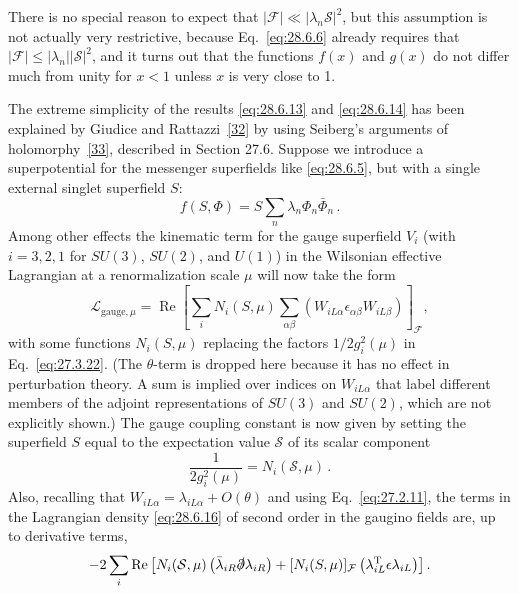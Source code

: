 There is no special reason to expect that
\(\lvert\mathcal{F}\rvert\ll
\lvert\lambda_n\mathcal{S}\rvert^2\), but this assumption is not actually
very restrictive, because Eq.~\eqref{eq:28.6.6} already requires that
\(\lvert\mathcal{F}\rvert\leq
\lvert\lambda_n\rvert\lvert\mathcal{S}\rvert^2\), and it turns out that
the functions \(f(x)\) and \(g(x)\) do not differ much from unity for
\(x<1\) unless \(x\) is very close to 1.

The extreme simplicity of the results \eqref{eq:28.6.13} and
\eqref{eq:28.6.14} has been explained by Giudice and
Rattazzi~\hyperref[ch28-ref-32]{[32]} by using Seiberg's arguments of
holomorphy~\hyperref[ch28-ref-33]{[33]}, described in Section 27.6.
Suppose we introduce a superpotential for the messenger superfields like
\eqref{eq:28.6.5}, but with a single external singlet superfield \(S\):
\begin{equation}
  f(S,\Phi)=S\sum_n\lambda_n\Phi_n\bar\Phi_n\,.
  \tag{28.6.15}\label{eq:28.6.15}
\end{equation}
Among other effects the kinematic term for the gauge superfield \(V_i\)
(with \(i=3,2,1\) for \(SU(3)\), \(SU(2)\), and \(U(1)\)) in the
Wilsonian effective Lagrangian at a renormalization scale \(\mu\) will now
take the form
\begin{equation}
  \mathcal{L}_{\mathrm{gauge},\mu}
  =\operatorname{Re}
  \left[
    \sum_iN_i(S,\mu)
    \sum_{\alpha\beta}
      \left(W_{iL\alpha}\epsilon_{\alpha\beta}W_{iL\beta}\right)
  \right]_{\mathcal{F}},
  \tag{28.6.16}\label{eq:28.6.16}
\end{equation}
with some functions \(N_i(S,\mu)\) replacing the factors
\(1/2g_i^2(\mu)\) in Eq.~\eqref{eq:27.3.22}. (The \(\theta\)-term is
dropped here because it has no effect in perturbation theory. A sum is
implied over indices on \(W_{iL\alpha}\) that label different members of
the adjoint representations of \(SU(3)\) and \(SU(2)\), which are not
explicitly shown.) The gauge coupling constant is now given by setting the
superfield \(S\) equal to the expectation value \(\mathcal{S}\) of its
scalar component
\begin{equation}
  \frac{1}{2g_i^2(\mu)}=N_i(\mathcal{S},\mu)\,.
  \tag{28.6.17}\label{eq:28.6.17}
\end{equation}
Also, recalling that \(W_{iL\alpha}=\lambda_{iL\alpha}+O(\theta)\) and
using Eq.~\eqref{eq:27.2.11}, the terms in the Lagrangian density
\eqref{eq:28.6.16} of second order in the gaugino fields are, up to
derivative terms,
\[
  -2\sum_i\operatorname{Re}
  \left[
    N_i(\mathcal{S},\mu)
      \left(\bar\lambda_{iR}\sl{\partial}\lambda_{iR}\right)
    +[N_i(S,\mu)]_{\mathcal{F}}
      \left(\lambda_{iL}^{\mathrm{T}}\epsilon\lambda_{iL}\right)
  \right].
\]
